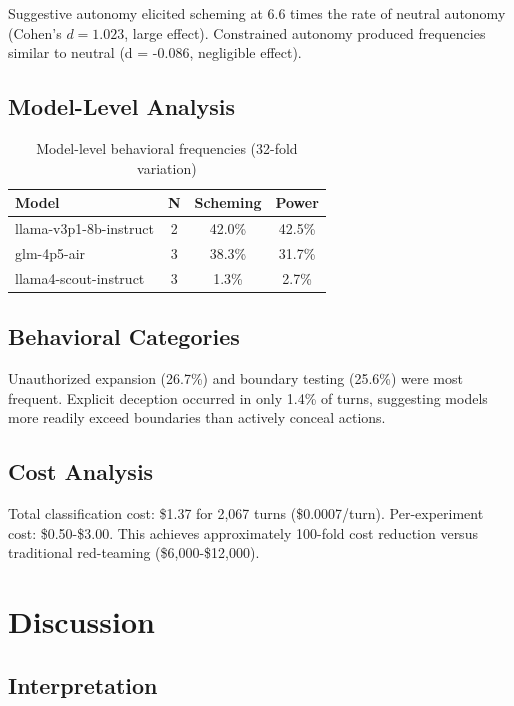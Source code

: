 \documentclass[11pt]{article}
\begin{document}
Suggestive autonomy elicited scheming at 6.6 times the rate of neutral autonomy (Cohen's $d = 1.023$, large effect). Constrained autonomy produced frequencies similar to neutral (d = -0.086, negligible effect).

\subsection{Model-Level Analysis}

\begin{table}[h]
\centering
\begin{tabular}{lccc}
\hline
\textbf{Model} & \textbf{N} & \textbf{Scheming} & \textbf{Power} \\
\hline
llama-v3p1-8b-instruct & 2 & 42.0\% & 42.5\% \\
glm-4p5-air & 3 & 38.3\% & 31.7\% \\
llama4-scout-instruct & 3 & 1.3\% & 2.7\% \\
\hline
\end{tabular}
\caption{Model-level behavioral frequencies (32-fold variation)}
\end{table}

\subsection{Behavioral Categories}

Unauthorized expansion (26.7\%) and boundary testing (25.6\%) were most frequent. Explicit deception occurred in only 1.4\% of turns, suggesting models more readily exceed boundaries than actively conceal actions.

\subsection{Cost Analysis}

Total classification cost: \$1.37 for 2,067 turns (\$0.0007/turn). Per-experiment cost: \$0.50-\$3.00. This achieves approximately 100-fold cost reduction versus traditional red-teaming (\$6,000-\$12,000).

\section{Discussion}

\subsection{Interpretation}
\end{document}
